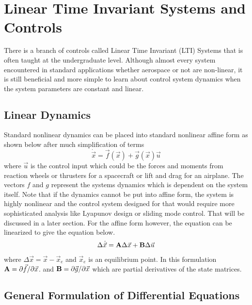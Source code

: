\section{Linear Time Invariant Systems and Controls}

There is a branch of controls called Linear Time Invariant (LTI)
Systems that is often taught at the undergraduate level. Although
almost every system encountered in standard applications whether
aerospace or not are non-linear, it is still beneficial and more
simple to learn about control system dynamics when the system
parameters are constant and linear. 

\subsection{Linear Dynamics}

Standard nonlinear dynamics can be placed into standard
nonlinear affine form as shown below after much simplification of
terms
\begin{equation}
  \dot{\vec{x}} = \vec{f}(\vec{x}) + \vec{g}(\vec{x})\vec{u}
\end{equation}
where $\vec{u}$ is the control input which could be the forces and
moments from reaction wheels or thrusters for a spacecraft or lift and drag for an airplane. The vectors $f$ and $g$ represent the systems dynamics which is dependent on the system itself. Note that if the dynamics cannot be put into affine form, the system is highly nonlinear and the control system designed for that would require more sophisticated analysis like Lyapunov design or sliding mode control. That will be discussed in a later section. For the affine form however, the equation can be
linearized to give the equation below. 
\begin{equation}
  \Delta \dot{\vec{x}} = {\bf A}\Delta {\vec{x}} + {\bf B}\Delta \vec{u}
\end{equation}
where $\Delta \vec{x} = \vec{x} - \vec{x}_e$ and $\vec{x}_e$ is an
equilibrium point. In this formulation ${\bf A} = \partial \vec{f}/\partial \vec{x}$. and 
${\bf B} = \partial \vec{g}/\partial \vec{x}$ which are partial derivatives of the state matrices.

\subsection{General Formulation of Differential Equations}

